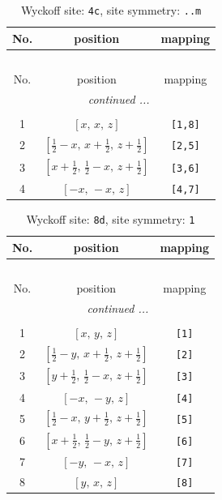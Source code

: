 \documentclass[fleqn,8pt]{jsarticle}
\begin{document}
\renewcommand{\arraystretch}{1.2}
\begin{longtable}{ccc}
\caption{Wyckoff site: {\tt 4c}, site symmetry: {\tt ..m}}
 \\
 \hline \hline
No. & position & mapping \\ \hline \endfirsthead

\multicolumn{2}{l}{\tablename\ \thetable{}} \\
 \hline \hline
No. & position & mapping \\ \hline \endhead

 \hline \hline
\multicolumn{2}{r}{\footnotesize\it continued ...} \\ \endfoot

 \hline \hline
\multicolumn{2}{r}{} \\ \endlastfoot

1 & $\left[ x,\, x,\, z \right]$ & {\tt [1,8]} \\ \hline
2 & $\left[ \frac{1}{2} - x,\, x + \frac{1}{2},\, z + \frac{1}{2} \right]$ & {\tt [2,5]} \\ \hline
3 & $\left[ x + \frac{1}{2},\, \frac{1}{2} - x,\, z + \frac{1}{2} \right]$ & {\tt [3,6]} \\ \hline
4 & $\left[ - x,\, - x,\, z \right]$ & {\tt [4,7]} \\
\end{longtable}
\renewcommand{\arraystretch}{1.2}
\begin{longtable}{ccc}
\caption{Wyckoff site: {\tt 8d}, site symmetry: {\tt 1}}
 \\
 \hline \hline
No. & position & mapping \\ \hline \endfirsthead

\multicolumn{2}{l}{\tablename\ \thetable{}} \\
 \hline \hline
No. & position & mapping \\ \hline \endhead

 \hline \hline
\multicolumn{2}{r}{\footnotesize\it continued ...} \\ \endfoot

 \hline \hline
\multicolumn{2}{r}{} \\ \endlastfoot

1 & $\left[ x,\, y,\, z \right]$ & {\tt [1]} \\ \hline
2 & $\left[ \frac{1}{2} - y,\, x + \frac{1}{2},\, z + \frac{1}{2} \right]$ & {\tt [2]} \\ \hline
3 & $\left[ y + \frac{1}{2},\, \frac{1}{2} - x,\, z + \frac{1}{2} \right]$ & {\tt [3]} \\ \hline
4 & $\left[ - x,\, - y,\, z \right]$ & {\tt [4]} \\ \hline
5 & $\left[ \frac{1}{2} - x,\, y + \frac{1}{2},\, z + \frac{1}{2} \right]$ & {\tt [5]} \\ \hline
6 & $\left[ x + \frac{1}{2},\, \frac{1}{2} - y,\, z + \frac{1}{2} \right]$ & {\tt [6]} \\ \hline
7 & $\left[ - y,\, - x,\, z \right]$ & {\tt [7]} \\ \hline
8 & $\left[ y,\, x,\, z \right]$ & {\tt [8]} \\
\end{longtable}
\end{document}
